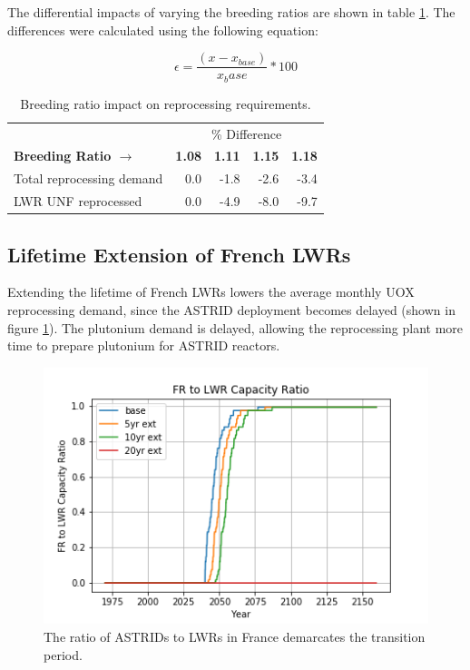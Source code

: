 The differential impacts of varying the breeding ratios are
shown in table \ref{tab:br_diff}. The differences were calculated
using the following equation:

\[ \epsilon = \frac{(x - x_{base})}{x_base} * 100 \]

\begin{table}[h]
	\centering
        \caption{Breeding ratio impact on reprocessing requirements.}
	\begin{tabular}{lrrrr}
		\hline
                & \multicolumn{4}{c}{\% Difference} \\
		\textbf{Breeding Ratio $\longrightarrow$}& \textbf{1.08}& \textbf{1.11} & \textbf{1.15} & \textbf{1.18} \\
		\hline
		Total reprocessing demand & 0.0 & -1.8 & -2.6 & -3.4 \\ 
		\gls{LWR} \gls{UNF} reprocessed & 0.0  & -4.9 & -8.0 & -9.7 \\
		\hline
	\end{tabular}
	\label{tab:br_diff}
\end{table}


\subsection{Lifetime Extension of French \glspl{LWR}}\label{sec:life}
Extending the lifetime of French \glspl{LWR} lowers the average
monthly \gls{UOX} reprocessing demand, since the \gls{ASTRID} deployment becomes 
delayed (shown in figure \ref{fig:pow_diff}). The plutonium demand is delayed,
 allowing the reprocessing plant more time to prepare plutonium for \gls{ASTRID} reactors.

\begin{figure}[htbp!]
    \begin{center}
        \includegraphics[scale=0.7]{./images/sensitivity/pow_ratio.png}
    \end{center}
    \caption{The ratio of \glspl{ASTRID} to \glspl{LWR} in France demarcates 
    the transition period.}
    \label{fig:pow_diff}
\end{figure}


